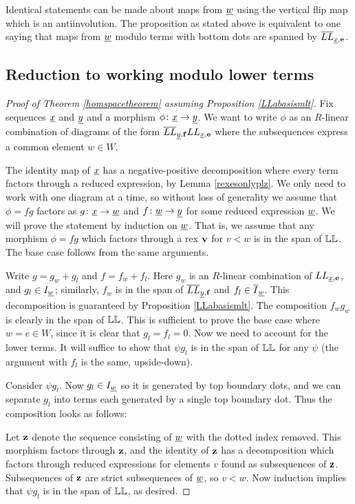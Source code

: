 Identical statements can be made about maps from ${\underline{w}}$ using the vertical flip map which is an antiinvolution. The proposition as stated above is equivalent to one
saying that maps from ${\underline{w}}$ modulo terms with bottom dots are spanned by $\overline{LL}_{{\underline{x}},{\mathbf e}}$.

\subsection{Reduction to working modulo lower terms}
\label{subsec-reduction1}

\begin{proof}[Proof of Theorem \ref{homspacetheorem} assuming Proposition \ref{LLabasismlt}] Fix sequences ${\underline{x}}$ and ${\underline{y}}$ and a morphism $\phi \colon {\underline{x}} \rightarrow {\underline{y}}$. We want to write $\phi$ as
an $R$-linear combination of diagrams of the form $\overline{LL}_{{\underline{y}},{\mathbf f}} LL_{{\underline{x}},{\mathbf e}}$ where the subsequences express a common element $w \in W$.

The identity map of ${\underline{x}}$ has a negative-positive decomposition where every term factors through a reduced expression, by Lemma \ref{rexesonlyplz}. We only need to work with one diagram at
a time, so without loss of generality we assume that $\phi=fg$ factors as $g \colon {\underline{x}} \rightarrow {\underline{w}}$ and $f \colon {\underline{w}} \rightarrow {\underline{y}}$ for some reduced expression ${\underline{w}}$. We will prove the statement by
induction on ${\underline{w}}$. That is, we assume that any morphism $\phi=fg$ which factors through a rex ${\mathbf v}$ for $v<w$ is in the span of $\mathbb{LL}$. The base case follows from the same arguments.

Write $g = g_w + g_l$ and $f = f_w + f_l$. Here $g_w$ is an $R$-linear combination of $LL_{{\underline{x}},{\mathbf e}}$, and $g_l \in I_{{\underline{w}}}$; similarly, $f_w$ is in the span of $\overline{LL}_{{\underline{y}},{\mathbf f}}$ and $f_l
\in \overline{I}_{{\underline{w}}}$. This decomposition is guaranteed by Proposition \ref{LLabasismlt}. The composition $f_w g_w$ is clearly in the span of $\mathbb{LL}$. This is sufficient to prove the base
case where $w = e \in W$, since it is clear that $g_l=f_l=0$. Now we need to account for the lower terms. It will suffice to show that $\psi g_l$ is in the span of $\mathbb{LL}$ for
any $\psi$ (the argument with $f_l$ is the same, upside-down).

Consider $\psi g_l$. Now $g_l \in I_{{\underline{w}}}$ so it is generated by top boundary dots, and we can separate $g_l$ into terms each generated by a single top boundary dot. Thus the composition
looks as follows:


Let ${\mathbf z}$ denote the sequence consisting of ${\underline{w}}$ with the dotted index removed. This morphism factors through ${\mathbf z}$, and the identity of ${\mathbf z}$ has a decomposition which factors through
reduced expressions for elements $v$ found as subsequences of ${\mathbf z}$. Subsequences of ${\mathbf z}$ are strict subsequences of ${\underline{w}}$, so $v < w$. Now induction implies that $\psi g_l$ is in the
span of $\mathbb{LL}$, as desired. \end{proof}


